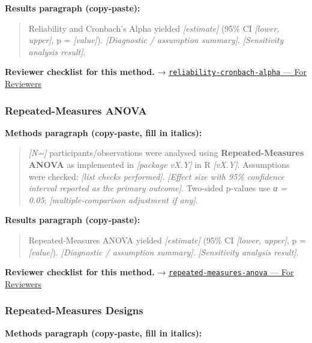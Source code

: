 \documentclass[
]{article}
\begin{document}
\textbf{Results paragraph (copy-paste):}

\begin{quote}
Reliability and Cronbach's Alpha yielded \emph{{[}estimate{]}} (95\% CI
\emph{{[}lower, upper{]}}, p = \emph{{[}value{]}}). \emph{{[}Diagnostic
/ assumption summary{]}}. \emph{{[}Sensitivity analysis result{]}}.
\end{quote}

\textbf{Reviewer checklist for this method.} →
\href{../chapters/14-clinical/reliability-cronbach-alpha.Rmd\#for-reviewers}{\texttt{reliability-cronbach-alpha}
--- For Reviewers}

\subsubsection{Repeated-Measures ANOVA}\label{repeated-measures-anova}

\textbf{Methods paragraph (copy-paste, fill in italics):}

\begin{quote}
\emph{{[}N={]}} participants/observations were analysed using
\textbf{Repeated-Measures ANOVA} as implemented in \emph{{[}package
vX.Y{]}} in R \emph{{[}vX.Y{]}}. Assumptions were checked: \emph{{[}list
checks performed{]}}. \emph{{[}Effect size with 95\% confidence interval
reported as the primary outcome{]}}. Two-sided p-values use \emph{α =
0.05}; \emph{{[}multiple-comparison adjustment if any{]}}.
\end{quote}

\textbf{Results paragraph (copy-paste):}

\begin{quote}
Repeated-Measures ANOVA yielded \emph{{[}estimate{]}} (95\% CI
\emph{{[}lower, upper{]}}, p = \emph{{[}value{]}}). \emph{{[}Diagnostic
/ assumption summary{]}}. \emph{{[}Sensitivity analysis result{]}}.
\end{quote}

\textbf{Reviewer checklist for this method.} →
\href{../chapters/04-inferential/repeated-measures-anova.Rmd\#for-reviewers}{\texttt{repeated-measures-anova}
--- For Reviewers}

\subsubsection{Repeated-Measures
Designs}\label{repeated-measures-designs}

\textbf{Methods paragraph (copy-paste, fill in italics):}
\end{document}
